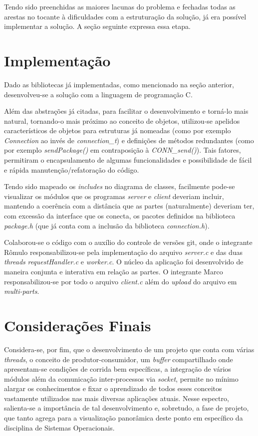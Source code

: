 \documentclass[12pt]{article}
\begin{document}
Tendo sido preenchidas as maiores lacunas do problema e fechadas todas as arestas no tocante à dificuldades com a estruturação da solução, já era possível implementar a solução. A seção seguinte expressa essa etapa.

\section{Implementação}

Dado as bibliotecas já implementadas, como mencionado na seção anterior, desenvolveu-se a solução com a linguagem de programação C.

Além das abstrações já citadas, para facilitar o desenvolvimento e torná-lo mais natural, tornando-o mais próximo ao conceito de objetos, utilizou-se apelidos característicos de objetos para estruturas já nomeadas (como por exemplo \emph{Connection} ao invés de \emph{connection\_t}) e definições de métodos redundantes (como por exemplo \emph{sendPackage()} em contraposição à \emph{CONN\_send()}). Tais fatores, permitiram o encapsulamento de algumas funcionalidades e possibilidade de fácil e rápida manutenção/refatoração do código.

Tendo sido mapeado os \emph{includes} no diagrama de classes, facilmente pode-se visualizar os módulos que os programas \emph{server} e \emph{client} deveriam incluir, mantendo a coerência com a distância que as partes (naturalmente) deveriam ter, com excessão da interface que os conecta, os pacotes definidos na biblioteca \emph{package.h} (que já conta com a inclusão da biblioteca \emph{connection.h}).

Colaborou-se o código com o auxílio do controle de versões git, onde o integrante Rômulo responsabilizou-se pela implementação do arquivo \emph{server.c} e das duas \emph{threads} \emph{requestHandler.c} e \emph{worker.c}. O núcleo da aplicação foi desenvolvido de maneira conjunta e interativa em relação as partes. O integrante Marco responsabilizou-se por todo o arquivo \emph{client.c} além do \textit{upload} do arquivo em \textit{multi-parts}.

\section{Considerações Finais}

Considera-se, por fim, que o desenvolvimento de um projeto que conta com várias \textit{threads}, o conceito de produtor-consumidor, um \textit{buffer} compartilhado onde apresentam-se condições de corrida bem específicas, a integração de vários módulos além da comunicação inter-processos via \textit{socket}, permite no mínimo alargar os conhecimentos e fixar o aprendizado de todos esses conceitos vastamente utilizados nas mais diversas aplicações atuais. Nesse espectro, salienta-se a importância de tal desenvolvimento e, sobretudo, a fase de projeto, que tanto agrega para a visualização panorâmica deste ponto em específico da disciplina de Sistemas Operacionais.
\end{document}

